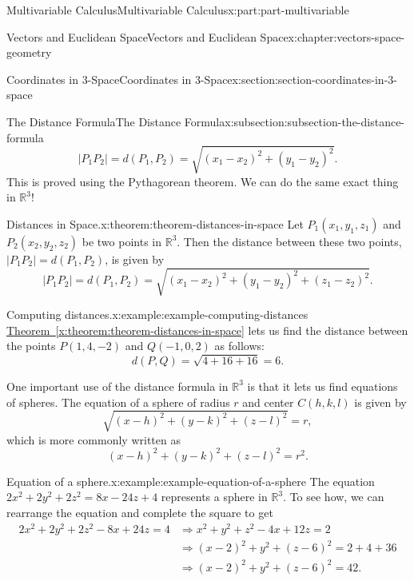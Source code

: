 \documentclass[twoside,10pt,]{tufte-book}
\newcommand{\xreffont}{\relax}
\numberwithin{equation}{part}
\newcommand{\RR}{\mathbb{R}}
\begin{document}
\begin{partptx}{Multivariable Calculus}{}{Multivariable Calculus}{}{}{x:part:part-multivariable}
\begin{chapterptx}{Vectors and Euclidean Space}{}{Vectors and Euclidean Space}{}{}{x:chapter:vectors-space-geometry}
\begin{sectionptx}{Coordinates in 3-Space}{}{Coordinates in 3-Space}{}{}{x:section:section-coordinates-in-3-space}
\begin{subsectionptx}{The Distance Formula}{}{The Distance Formula}{}{}{x:subsection:subsection-the-distance-formula}
\begin{equation*}
|P_{1}P_{2}| = d(P_{1},P_{2}) = \sqrt{(x_{1}-x_{2})^{2}+(y_{1}-y_{2})^{2}}.
\end{equation*}
This is proved using the Pythagorean theorem. We can do the same exact thing in \(\RR^{3}\)!%
\begin{theorem}{Distances in Space.}{}{x:theorem:theorem-distances-in-space}%
%
Let \(P_{1}(x_{1},y_{1},z_{1})\) and \(P_{2}(x_{2},y_{2},z_{2})\) be two points in \(\RR^{3}\). Then the distance between these two points, \(|P_{1}P_{2}| = d(P_{1},P_{2})\), is given by%
\begin{equation*}
|P_{1}P_{2}| = d(P_{1},P_{2}) = \sqrt{(x_{1}-x_{2})^{2}+(y_{1}-y_{2})^{2} + (z_{1}-z_{2})^{2}}.
\end{equation*}
%
\end{theorem}
\begin{example}{Computing distances.}{x:example:example-computing-distances}%
\hyperref[x:theorem:theorem-distances-in-space]{Theorem~{\xreffont\ref{x:theorem:theorem-distances-in-space}}} lets us find the distance between the points \(P(1,4,-2)\) and \(Q(-1,0,2)\) as follows:%
%
\begin{equation*}
d(P,Q) = \sqrt{4+16+16} = 6.
\end{equation*}
\end{example}
One important use of the distance formula in \(\RR^{3}\) is that it lets us find equations of spheres. The equation of a sphere of radius \(r\) and center \(C(h,k,l)\) is given by%
\begin{equation*}
\sqrt{(x-h)^{2}+(y-k)^{2}+(z-l)^{2}} = r,
\end{equation*}
which is more commonly written as%
\begin{equation*}
(x-h)^{2}+(y-k)^{2}+(z-l)^{2} = r^{2}.
\end{equation*}
%
\begin{example}{Equation of a sphere.}{x:example:example-equation-of-a-sphere}%
The equation \(2x^{2}+2y^{2}+2z^{2} = 8x - 24z + 4\) represents a sphere in \(\RR^{3}\). To see how, we can rearrange the equation and complete the square to get%
%
\begin{align*}
2x^{2}+2y^{2}+2z^{2} - 8x + 24z = 4 & \Rightarrow x^{2}+y^{2}+z^{2} - 4x + 12z = 2 \\
& \Rightarrow (x-2)^{2} + y^{2} + (z-6)^{2} = 2 + 4 + 36\\
& \Rightarrow (x-2)^{2} + y^{2} + (z-6)^{2} = 42.
\end{align*}

\end{example}
\end{subsectionptx}
\end{sectionptx}
\end{chapterptx}
\end{partptx}
\end{document}

